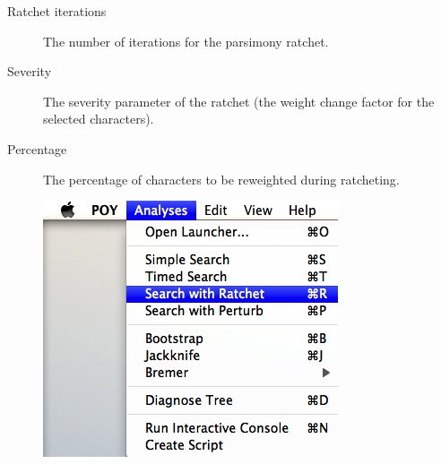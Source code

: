 {\begin{description}
\item[Ratchet iterations] The number of iterations for the parsimony
ratchet.
\item[Severity] The severity parameter of the ratchet (the weight
change factor for the selected characters).
\item[Percentage] The percentage of characters to be reweighted during ratcheting.
\end{description}

\begin{figure}
\centering
\begin{minipage}[c]{0.45\textwidth}
\includegraphics[width=\textwidth]{doc/figures/searchwithratchet_menu.jpg}
\end{minipage}
\,
\begin{minipage}[c]{0.52\textwidth}

\end{minipage}
\end{figure}}
